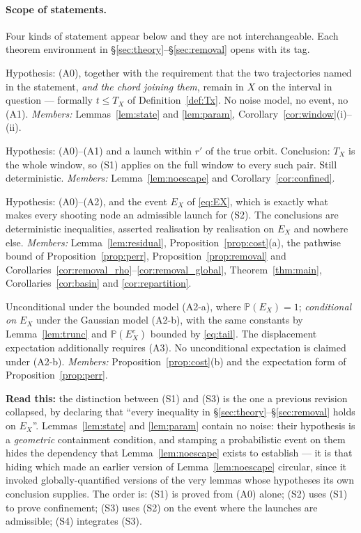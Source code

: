 \documentclass[11pt]{article}
\theoremstyle{remark}\newtheorem{remark}{Remark}
\newcommand{\readthis}[1]{\textbf{Read this:} #1}
\begin{document}
\paragraph{Scope of statements.}
Four kinds of statement appear below and they are not interchangeable. Each theorem environment in \S\ref{sec:theory}--\S\ref{sec:removal} opens with its tag.
\begin{description}[nosep,leftmargin=2.2em]
\item[(S1) Local deterministic flow estimates.] Hypothesis: (A0), together with the requirement that the two trajectories named in the statement, \emph{and the chord joining them}, remain in $X$ on the interval in question --- formally $t\le T_X$ of Definition~\ref{def:Tx}. No noise model, no event, no (A1). \emph{Members:} Lemmas~\ref{lem:state} and \ref{lem:param}, Corollary~\ref{cor:window}(i)--(ii).
\item[(S2) Confinement under (A1).] Hypothesis: (A0)--(A1) and a launch within $r'$ of the true orbit. Conclusion: $T_X$ is the whole window, so (S1) applies on the full window to every such pair. Still deterministic. \emph{Members:} Lemma~\ref{lem:noescape} and Corollary~\ref{cor:confined}.
\item[(S3) Noisy-cost statements, pathwise on $E_X$.] Hypothesis: (A0)--(A2), and the event $E_X$ of \eqref{eq:EX}, which is exactly what makes every shooting node an admissible launch for (S2). The conclusions are deterministic inequalities, asserted realisation by realisation on $E_X$ and nowhere else. \emph{Members:} Lemma~\ref{lem:residual}, Proposition~\ref{prop:cost}(a), the pathwise bound of Proposition~\ref{prop:perr}, Proposition~\ref{prop:removal} and Corollaries~\ref{cor:removal_rho}--\ref{cor:removal_global}, Theorem~\ref{thm:main}, Corollaries~\ref{cor:basin} and \ref{cor:repartition}.
\item[(S4) Expectations.] Unconditional under the bounded model (A2-a), where $\mathbb P(E_X)=1$; \emph{conditional on $E_X$} under the Gaussian model (A2-b), with the same constants by Lemma~\ref{lem:trunc} and $\mathbb P(E_X^{c})$ bounded by \eqref{eq:tail}. The displacement expectation additionally requires (A3). No unconditional expectation is claimed under (A2-b). \emph{Members:} Proposition~\ref{prop:cost}(b) and the expectation form of Proposition~\ref{prop:perr}.
\end{description}
\readthis{the distinction between (S1) and (S3) is the one a previous revision collapsed, by declaring that ``every inequality in \S\ref{sec:theory}--\S\ref{sec:removal} holds on $E_X$''. Lemmas~\ref{lem:state} and \ref{lem:param} contain no noise: their hypothesis is a \emph{geometric} containment condition, and stamping a probabilistic event on them hides the dependency that Lemma~\ref{lem:noescape} exists to establish --- it is that hiding which made an earlier version of Lemma~\ref{lem:noescape} circular, since it invoked globally-quantified versions of the very lemmas whose hypotheses its own conclusion supplies. The order is: (S1) is proved from (A0) alone; (S2) uses (S1) to prove confinement; (S3) uses (S2) on the event where the launches are admissible; (S4) integrates (S3).}
\end{document}
